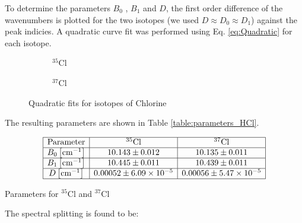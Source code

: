 \documentclass{article}
\begin{document}
To determine the parameters $B_0$ , $B_1$ and $D$, the first order difference of the wavenumbers is plotted for the two isotopes (we used $D \approx D_0 \approx D_1$) against the peak indicies. A quadratic curve fit was performed using Eq. \ref{eq:Quadratic} for each isotope.

\begin{figure}[H]
	\centering
	\begin{subfigure}{0.45\textwidth}
		\centering
		\scalebox{0.50}{}
		\caption{$^{35}$Cl}
		\label{fig:Quadratic_fit_Cl35}
	\end{subfigure}
	\hspace{0.5cm}
	\begin{subfigure}{0.45\textwidth}
		\centering
		\scalebox{0.50}{}
		\caption{$^{37}$Cl}
		\label{fig:Quadratic_fit_Cl37}
	\end{subfigure}
	\caption{Quadratic fits for isotopes of Chlorine}
\end{figure}

The resulting parameters are shown in Table \ref{table:parameters_HCl}.

\begin{table}[h!]
    \centering
    \[
    \begin{array}{|c|c|c|}
    \hline \text{Parameter} &^{35} \mathrm{Cl} & ^{37} \mathrm{Cl} \\
    \hline B_0\left[\mathrm{cm}^{-1}\right] & 10.143 \pm 0.012 & 10.135 \pm 0.011 \\
    \hline B_1\left[\mathrm{cm}^{-1}\right] & 10.445 \pm 0.011 & 10.439 \pm 0.011 \\
    \hline D\left[\mathrm{cm}^{-1}\right] & 0.00052 \pm 6.09 \times 10^{-5} &  0.00056 \pm 5.47 \times 10^{-5} \\
    \hline
    \end{array}
    \]
    \caption{Parameters for $^{35} \mathrm{Cl}$ and $^{37} \mathrm{Cl}$}
    \label{table:parameters_HCl}
\end{table}

\pagebreak{}

The spectral splitting is found to be: 
\end{document}
